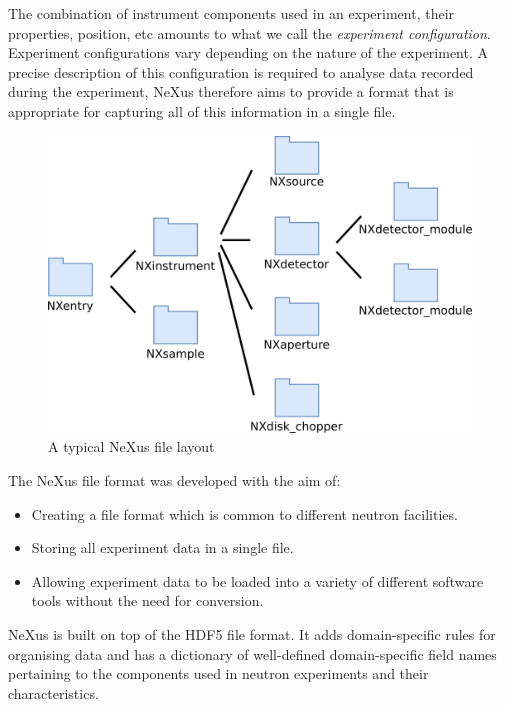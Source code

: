 The combination of instrument components used in an experiment, their properties, position, etc amounts to what we call the \textit{experiment configuration}. Experiment configurations vary depending on the nature of the experiment. A precise description of this configuration is required to analyse data recorded during the experiment, NeXus therefore aims to provide a format that is appropriate for capturing all of this information in a single file.

\begin{figure}
\begin{center}
\includegraphics[width=0.8\linewidth]{instrument_arch.png}
\end{center}
\caption{A typical NeXus file layout}
\end{figure}
The NeXus file format was developed with the aim of:
\begin{itemize}
\setlength\itemsep{0.7em}
\item Creating a file format which is common to different neutron facilities.
\item Storing all experiment data in a single file.
\item Allowing experiment data to be loaded into a variety of different software tools without the need for conversion.
\end{itemize}
\smallskip
NeXus is built on top of the HDF5 file format. It adds domain-specific rules for organising data and has a dictionary of well-defined domain-specific field names pertaining to the components used in neutron experiments and their characteristics.
